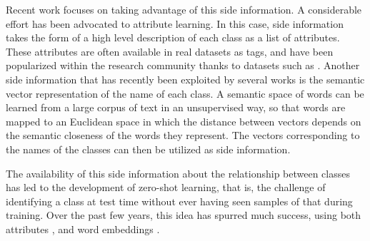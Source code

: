 \documentclass{bmvc2k}
\begin{document}
Recent work focuses on taking advantage of this side information.
A considerable effort has been advocated to attribute learning. In this case,
side information takes the form of a high level description of each class as a list of attributes.
These attributes are often available in real datasets as tags, and have been
popularized within the research community thanks to datasets such as
\cite{Farhadi2009,lampert2009learning,patterson2012sun}.
Another side information that has recently been exploited by several works
\cite{socher2013zero_csm,frome2013devise,norouzi2013zero} is the semantic vector
representation of the name of each class. A semantic space of words can be
learned from a large corpus of text in an unsupervised way, so that
words are mapped to an Euclidean space in which the distance between vectors
depends on the semantic closeness of the words they represent. The vectors corresponding to the 
names of the classes can then be utilized as side information.

The availability of this side information about the relationship between classes
has led to the development of zero-shot learning, that is, the challenge of
identifying a class at test time without ever having seen samples of that during
training. Over the past few years, this idea has spurred much success,
using both attributes
\cite{pala_geoff2009zsl,akata2013label,romera2015embarrassingly,lampert2009learning},
and word embeddings \cite{norouzi2013zero,socher2013zero_csm}.
\end{document}
